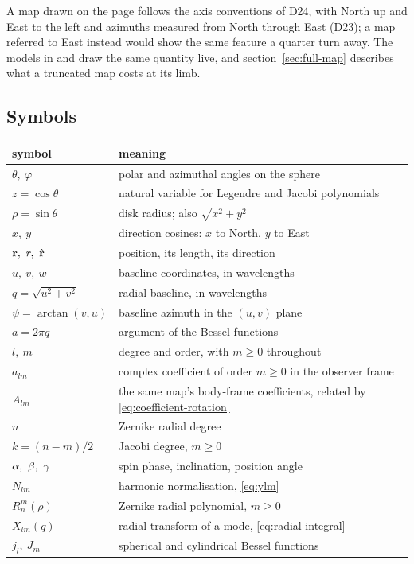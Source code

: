 A map drawn on the page follows the axis conventions of D24, with North up and East to the
left and azimuths measured from North through East (D23); a map referred to East instead
would show the same feature a quarter turn away.  The models in  and
 draw the same quantity live, and section~\ref{sec:full-map}
describes what a truncated map costs at its limb.

\subsection{Symbols}

\begin{center}
\begin{tabular}{ll}
\hline
symbol & meaning \\
\hline
$\theta,\ \varphi$ & polar and azimuthal angles on the sphere \\
$z = \cos\theta$ & natural variable for Legendre and Jacobi polynomials \\
$\rho = \sin\theta$ & disk radius; also $\sqrt{x^2+y^2}$ \\
$x,\ y$ & direction cosines: $x$ to North, $y$ to East \\
$\vecr,\ r,\ \uvecr$ & position, its length, its direction \\
$u,\ v,\ w$ & baseline coordinates, in wavelengths \\
$q = \sqrt{u^2+v^2}$ & radial baseline, in wavelengths \\
$\psi = \arctan(v,u)$ & baseline azimuth in the $(u,v)$ plane \\
$a = 2\pi q$ & argument of the Bessel functions \\
$l,\ m$ & degree and order, with $m \ge 0$ throughout \\
$a_{lm}$ & complex coefficient of order $m \ge 0$ in the observer frame \\
$A_{lm}$ & the same map's body-frame coefficients, related by \eqref{eq:coefficient-rotation} \\
$n$ & Zernike radial degree \\
$k = (n-m)/2$ & Jacobi degree, $m \ge 0$ \\
$\alpha,\ \beta,\ \PA$ & spin phase, inclination, position angle \\
$N_{lm}$ & harmonic normalisation, \eqref{eq:ylm} \\
$R_n^m(\rho)$ & Zernike radial polynomial, $m \ge 0$ \\
$X_{lm}(q)$ & radial transform of a mode, \eqref{eq:radial-integral} \\
$j_l,\ J_m$ & spherical and cylindrical Bessel functions \\
\hline
\end{tabular}
\end{center}

